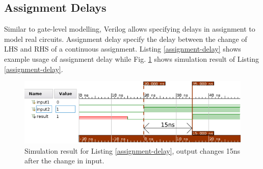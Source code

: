 \documentclass[a4paper,10pt]{article}
\theoremstyle{mytheor}
\newcommand{
  \insertverilog}[3]{
  
}
\begin{document}
\subsection{Assignment Delays}
Similar to gate-level modelling, Verilog allows specifying delays in
assignment to model real circuits. Assignment delay specify the delay
between the change of LHS and RHS of a continuous assignment. Listing
\ref{assignment-delay} shows example usage of assignment delay while
Fig. \ref{assignment-delay-sim} shows simulation result of Listing
\ref{assignment-delay}.

\insertverilog{./verilog_files/assignmentDelay.v}{assignment-delay}{Using assignment delay in Verilog.}

\begin{figure}[!h] \centering  
  \includegraphics[width=0.8\linewidth]{./resources/assignmentDelay.png}
  \caption{Simulation result for Listing \ref{assignment-delay}, output changes 15ns after the change in input.} 
  \label{assignment-delay-sim}
\end{figure}
\end{document}
